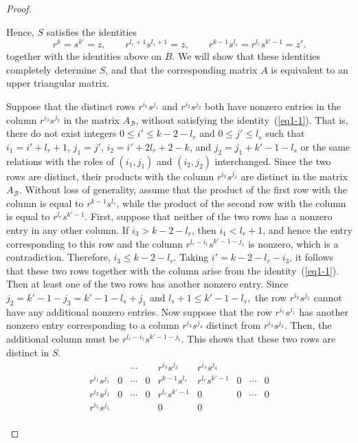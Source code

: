 \documentclass[11pt,reqno]{amsart}
\theoremstyle{plain}
\theoremstyle{remark}
\theoremstyle{definition}
\begin{document}
\begin{proof}
\begin{enumerate}
Hence, $S$ satisfies the identities
\begin{equation}\label{eq1}
r^k = s^{k'} = z,
\qquad
r^{l_r+1}s^{l_s+1} = z,
\qquad
r^{k-1}s^{l_s} = r^{l_r}s^{k'-1} = z'.
\end{equation}
together with the identities above on $B$. We will show that these identities completely determine $S$, and that the corresponding matrix $A$ is equivalent to an upper triangular matrix.

Suppose that the distinct rows $r^{i_1}s^{j_1}$ and $r^{i_2}s^{j_2}$ both have nonzero entries in the column $r^{i_3}s^{j_3}$ in the matrix $A_{\mathcal B}$, without satisfying the identity~(\ref{eq1-1}).
That is, there do not exist integers $0\leq i'\leq k-2-l_r$ and $0\leq j'\leq l_s$ such that
\(i_1=i'+l_r+1\),
\(j_1=j'\),
\(i_2=i'+2l_r+2-k\),
and
\(j_2=j_1+k'-1-l_s\) or the same relations with the roles of $(i_1,j_1)$ and $(i_2,j_2)$ interchanged.
Since the two rows are distinct, their products with the column $r^{i_3}s^{j_3}$ are distinct in the matrix $A_{\mathcal B}$. Without loss of generality, assume that the product of the first row with the column is equal to $r^{k-1}s^{l_s}$, while the product of the second row with the column is equal to $r^{l_r}s^{k'-1}$.
First, suppose that neither of the two rows has a nonzero entry in any other column. If $i_3 > k-2-l_r$, then
\(i_1 < l_r+1\),
and hence the entry corresponding to this row and the column $r^{l_r-i_1}s^{k'-1-j_1}$ is nonzero, which is a contradiction. Therefore,
\(i_3 \leq k-2-l_r\). %
Taking
\(i' = k-2-l_r-i_3\),
it follows that these two rows together with the column arise from the identity~(\ref{eq1-1}).
Then at least one of the two rows has another nonzero entry. Since
\(j_2 = k'-1-j_3 = k'-1-l_s+j_1\)
and
\(l_s+1 \leq k'-1-l_s,\)
the row $r^{i_2}s^{j_2}$ cannot have any additional nonzero entries.
Now suppose that the row $r^{i_1}s^{j_1}$ has another nonzero entry corresponding to a column $r^{i_4}s^{j_4}$ distinct from $r^{i_3}s^{j_3}$. Then, the additional column must be
\(r^{l_r-i_1}s^{k'-1-j_1}\). This shows that these two rows are distinct in $S$.
\[\begin{array}{c|ccccccccc}
                      &~  & \cdots &~  & r^{i_3}s^{j_3}    &r^{i_4}s^{j_4} &~&~&~\\ \hline
r^{i_1}s^{j_1} & 0  & \cdots & 0 & r^{k-1}s^{l_s}  & r^{l_r}s^{k'-1}&0&\cdots&0 \\
r^{i_2}s^{j_2} & 0  & \cdots & 0 & r^{l_r}s^{k'-1}  &0                     &0&\cdots&0\\
r^{i_5}s^{j_5} & ~ & ~         & ~ & 0                      &0                     &~&~&~\\
\end{array}
\]


\end{enumerate}
\end{proof}
\end{document}
